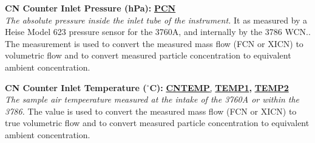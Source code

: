 \begin{hangparagraphs}
\textbf{CN Counter Inlet Pressure (hPa):}\hypertarget{PCN}{}\textbf{
}\textbf{\uline{PCN}}\\
\emph{The absolute pressure inside the inlet tube of the instrument.}
It as measured by a Heise Model 623 pressure
sensor for the 3760A, and internally by the 3786 WCN.. The measurement
is used to convert the measured mass flow (FCN or XICN) to volumetric
flow and to convert measured particle concentration to equivalent
ambient concentration.

\textbf{CN Counter Inlet Temperature ($^{\circ}$C):}\hypertarget{CNTEMP}{}\hypertarget{TEMP1}{}\hypertarget{TEMP2}{}\textbf{
}\textbf{\uline{CNTEMP}}\uline{,}
\textbf{\uline{TEMP1}}\textbf{,
}\textbf{\uline{TEMP2}}\textbf{}\\
\emph{The sample air tempeerature measured at the intake of the 3760A
or within the 3786.} The value is used to
convert the measured mass flow (FCN or XICN) to true volumetric flow
and to convert measured particle concentration to equivalent ambient
concentration.


\end{hangparagraphs}
